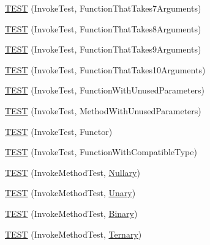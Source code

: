 \begin{DoxyCompactItemize}
\hyperlink{namespacetesting_1_1gmock__more__actions__test_af4756ff87444dc6deb438a350ab5527f}{T\+E\+ST} (Invoke\+Test, Function\+That\+Takes7\+Arguments)
\item 
\hyperlink{namespacetesting_1_1gmock__more__actions__test_a48d99224a323afa3c9772a868dd60214}{T\+E\+ST} (Invoke\+Test, Function\+That\+Takes8\+Arguments)
\item 
\hyperlink{namespacetesting_1_1gmock__more__actions__test_a65d674aacb46d8bf79dbdfe0d49df442}{T\+E\+ST} (Invoke\+Test, Function\+That\+Takes9\+Arguments)
\item 
\hyperlink{namespacetesting_1_1gmock__more__actions__test_a8939ea1ccb0d8787c926c92441b27f6c}{T\+E\+ST} (Invoke\+Test, Function\+That\+Takes10\+Arguments)
\item 
\hyperlink{namespacetesting_1_1gmock__more__actions__test_a0dd6901e637db57c56f1cf8052b6e1bf}{T\+E\+ST} (Invoke\+Test, Function\+With\+Unused\+Parameters)
\item 
\hyperlink{namespacetesting_1_1gmock__more__actions__test_a4f48af38351403b569fc6dfae7787ed2}{T\+E\+ST} (Invoke\+Test, Method\+With\+Unused\+Parameters)
\item 
\hyperlink{namespacetesting_1_1gmock__more__actions__test_ac56a4cb164b338d3f388ed3f4306a5a5}{T\+E\+ST} (Invoke\+Test, Functor)
\item 
\hyperlink{namespacetesting_1_1gmock__more__actions__test_af9dfd7f1d4186ee4de2d9871a19dba5a}{T\+E\+ST} (Invoke\+Test, Function\+With\+Compatible\+Type)
\item 
\hyperlink{namespacetesting_1_1gmock__more__actions__test_abb046fd809977722720c9ce63afd7af5}{T\+E\+ST} (Invoke\+Method\+Test, \hyperlink{namespacetesting_1_1gmock__more__actions__test_acdd2dd80f777fdb770b513b63064ac19}{Nullary})
\item 
\hyperlink{namespacetesting_1_1gmock__more__actions__test_a386ce48f1f0a49e2b94a16deeffc2084}{T\+E\+ST} (Invoke\+Method\+Test, \hyperlink{namespacetesting_1_1gmock__more__actions__test_aad456ea2ee1b0cb2741b676a34f540a3}{Unary})
\item 
\hyperlink{namespacetesting_1_1gmock__more__actions__test_a86221fa7d09853358e38c01b0d6ceced}{T\+E\+ST} (Invoke\+Method\+Test, \hyperlink{namespacetesting_1_1gmock__more__actions__test_a853c9f048674a60798b930750b74a1df}{Binary})
\item 
\hyperlink{namespacetesting_1_1gmock__more__actions__test_a2b98a8a68d37a0bec600227372a1cff8}{T\+E\+ST} (Invoke\+Method\+Test, \hyperlink{namespacetesting_1_1gmock__more__actions__test_ab98b352528a0b72625b4710a6fc648a1}{Ternary})

\end{DoxyCompactItemize}
